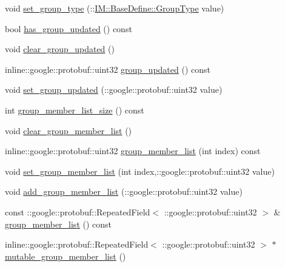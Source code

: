 \begin{DoxyCompactItemize}
\item 
void \hyperlink{class_i_m_1_1_base_define_1_1_server_group_info_a6831a6669ba311d63525c48b9c16fc81}{set\+\_\+group\+\_\+type} (\+::\hyperlink{namespace_i_m_1_1_base_define_a6ca6b4875848a9b5da46c019cf9b7d63}{I\+M\+::\+Base\+Define\+::\+Group\+Type} value)
\item 
bool \hyperlink{class_i_m_1_1_base_define_1_1_server_group_info_adfb6174b07b703f62a292aef271fe012}{has\+\_\+group\+\_\+updated} () const 
\item 
void \hyperlink{class_i_m_1_1_base_define_1_1_server_group_info_a8f19f6347964ad8e0422532259648b8c}{clear\+\_\+group\+\_\+updated} ()
\item 
inline\+::google\+::protobuf\+::uint32 \hyperlink{class_i_m_1_1_base_define_1_1_server_group_info_a3c9677345d1931c5280afe65a802f816}{group\+\_\+updated} () const 
\item 
void \hyperlink{class_i_m_1_1_base_define_1_1_server_group_info_a59162760156a259426ba2a64850aa2b3}{set\+\_\+group\+\_\+updated} (\+::google\+::protobuf\+::uint32 value)
\item 
int \hyperlink{class_i_m_1_1_base_define_1_1_server_group_info_abef8b2cb4c800812fa6d3371e4a91ea6}{group\+\_\+member\+\_\+list\+\_\+size} () const 
\item 
void \hyperlink{class_i_m_1_1_base_define_1_1_server_group_info_a4f17742443c7913ae5f86f66fceca646}{clear\+\_\+group\+\_\+member\+\_\+list} ()
\item 
inline\+::google\+::protobuf\+::uint32 \hyperlink{class_i_m_1_1_base_define_1_1_server_group_info_a368bde88ed572da4cf63c1158aaba016}{group\+\_\+member\+\_\+list} (int index) const 
\item 
void \hyperlink{class_i_m_1_1_base_define_1_1_server_group_info_a3e48f88c3badf85571f5c8c0feeb966f}{set\+\_\+group\+\_\+member\+\_\+list} (int index,\+::google\+::protobuf\+::uint32 value)
\item 
void \hyperlink{class_i_m_1_1_base_define_1_1_server_group_info_a48593cc7244e0e6a67bf9a36c81cad68}{add\+\_\+group\+\_\+member\+\_\+list} (\+::google\+::protobuf\+::uint32 value)
\item 
const \+::google\+::protobuf\+::\+Repeated\+Field$<$ \+::google\+::protobuf\+::uint32 $>$ \& \hyperlink{class_i_m_1_1_base_define_1_1_server_group_info_aaf83d13d1638f650666cab7c9aa4d5d7}{group\+\_\+member\+\_\+list} () const 
\item 
inline\+::google\+::protobuf\+::\+Repeated\+Field$<$ \+::google\+::protobuf\+::uint32 $>$ $\ast$ \hyperlink{class_i_m_1_1_base_define_1_1_server_group_info_af792ee19c06baa4defd7dc6339487a87}{mutable\+\_\+group\+\_\+member\+\_\+list} ()
\end{DoxyCompactItemize}
